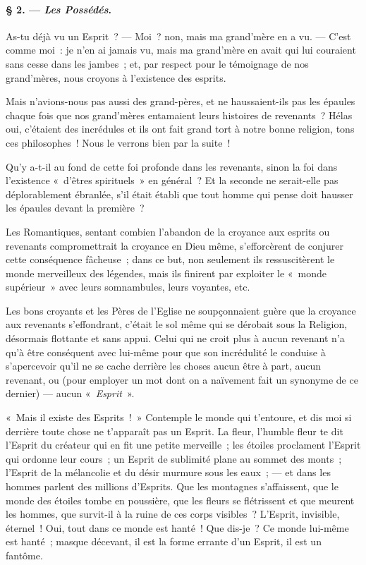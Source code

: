 \documentclass[french,twoside]{book} %
\begin{document}
\paragraph[{§ 2. — Les Possédés.}]{§ 2. — \emph{Les Possédés}.}
\noindent As-tu déjà vu un Esprit ? — Moi ? non, mais ma grand’mère en a vu. — C’est comme moi : je n’en ai jamais vu, mais ma grand’mère en avait qui lui couraient sans cesse dans les jambes ; et, par respect pour le témoignage de nos grand’mères, nous croyons à l’existence des esprits.\par
Mais n’avions-nous pas aussi des grand-pères, et ne haussaient-ils pas les épaules chaque fois que nos grand’mères entamaient leurs histoires de revenants ? Hélas oui, c’étaient des incrédules et ils ont fait grand tort à notre bonne religion, tons ces philosophes ! Nous le verrons bien par la suite !\par
Qu’y a-t-il au fond de cette foi profonde dans les revenants, sinon la foi dans l’existence « d’êtres spirituels » en général ? Et la seconde ne serait-elle pas déplorablement ébranlée, s’il était établi que tout homme qui pense doit hausser les épaules devant la première ?\par
Les Romantiques, sentant combien l’abandon de la croyance aux esprits ou revenants compromettrait la croyance en Dieu même, s’efforcèrent de conjurer cette conséquence fâcheuse ; dans ce but, non seulement ils ressuscitèrent le monde merveilleux des légendes, mais ils finirent par exploiter le « monde supérieur » avec leurs somnambules, leurs voyantes, etc.\par
Les bons croyants et les Pères de l’Eglise ne soupçonnaient guère que la croyance aux revenants  s’effondrant, c’était le sol même qui se dérobait sous la Religion, désormais flottante et sans appui. Celui qui ne croit plus à aucun revenant n’a qu’à être conséquent avec lui-même pour que son incrédulité le conduise à s’apercevoir qu’il ne se cache derrière les choses aucun être à part, aucun revenant, ou (pour employer un mot dont on a naïvement fait un synonyme de ce dernier) — aucun « \emph{Esprit} ».\par
« Mais il existe des Esprits ! » Contemple le monde qui t’entoure, et dis moi si derrière toute chose ne t’apparaît pas un Esprit. La fleur, l’humble fleur te dit l’Esprit du créateur qui en fit une petite merveille ; les étoiles proclament l’Esprit qui ordonne leur cours ; un Esprit de sublimité plane au sommet des monts ; l’Esprit de la mélancolie et du désir murmure sous les eaux ; — et dans les hommes parlent des millions d’Esprits. Que les montagnes s’affaissent, que le monde des étoiles tombe en poussière, que les fleurs se flétrissent et que meurent les hommes, que survit-il à la ruine de ces corps visibles ? L’Esprit, invisible, éternel ! Oui, tout dans ce monde est hanté ! Que dis-je ? Ce monde lui-même est hanté ; masque décevant, il est la forme errante d’un Esprit, il est un fantôme.\par
\end{document}
